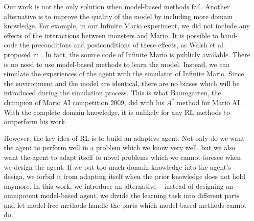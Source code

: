 Our work is not the only solution when model-based methods fail.
Another alternative is to improve the quality of the model by including more domain knowledge.
For example, in our Infinite Mario experiment, we did not include any effects 
of the interactions between monsters and Mario. It is possible to
hand-code the preconditions and postconditions of these effects, as Walsh et al. proposed in \cite{Walsh09}.
In fact, the source code of Infinite Mario is publicly available.
There is no need to use model-based methods to learn the model. Instead,
we can simulate the experiences of the agent with the simulator of Infinite Mario. 
Since the environment and the model are identical, there are no biases which will be 
introduced during the simulation process.
This is what Baumgarten, the champion of Mario AI competition 2009, did with his $A^*$ method for Mario AI \cite{Robin09}.
With the complete domain knowledge, it is unlikely for any RL methods to outperform his work.


However, the key idea of RL is to build an adaptive agent.
Not only do we want the agent to perform well in a problem which we know very well,
but we also want the agent to adapt itself to novel problems which we cannot foresee when we design the agent.
If we put too much domain knowledge into the agent's design, we forbid it from adapting 
itself when the prior knowledge does not hold anymore. 
In this work, we introduce an alternative -- instead of designing an omnipotent model-based agent, we
divide the learning task into different parts and let model-free methods handle the parts which model-based methods cannot do.




